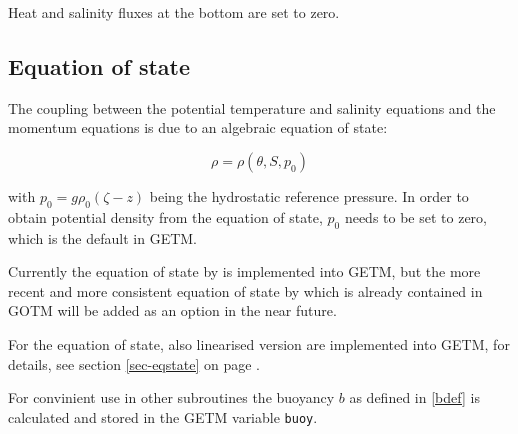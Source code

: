 Heat and salinity fluxes at the bottom are set to zero. 

\subsection{Equation of state}\label{Section_state_eq}

The coupling between the potential temperature and salinity 
equations and the momentum
equations is due to an algebraic equation of state:

\begin{equation}\label{UNESCO} 
\rho=\rho(\theta,S,p_0)
\end{equation}

with $p_0=g\rho_0(\zeta-z)$ being the hydrostatic reference pressure.
In order to obtain potential density from the equation of state, 
$p_0$ needs to be set to zero, which is the default in GETM.

Currently the equation of state by \cite{FOFONOFFea83} is implemented
into GETM, but the more recent and more consistent equation of state
by \cite{JACKETTea05} which is already contained in GOTM
will be added as an option in the near future.

For the equation of state, also linearised version are implemented into
GETM, for details, see section \ref{sec-eqstate} on page \pageref{sec-eqstate}.

For convinient use in other subroutines the buoyancy $b$ as defined in 
\eqref{bdef} is calculated and stored in the GETM variable {\tt buoy}.

